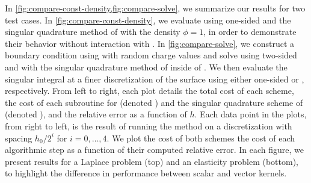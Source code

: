 In \cref{fig:compare-const-density,fig:compare-solve}, we summarize our results for two test cases. 
In \cref{fig:compare-const-density}, we evaluate \cite[Equation 8]{morse2020robust} using one-sided \qbkix and the singular quadrature method of \cite{YBZ} with the density $\phi=1$, in order to demonstrate their behavior without interaction with \gmres.
In \cref{fig:compare-solve}, we construct a boundary condition using \cite[Equation 25]{morse2020robust} with random charge values and solve \cite[Equation 5]{morse2020robust} using two-sided \qbkix and with the singular quadrature method of \cite{YBZ} inside of \gmres.
We then evaluate the singular integral at a finer discretization of the surface using either one-sided \qbkix or \cite{YBZ}, respectively.
From left to right, each plot details the total cost of each scheme, the cost of each subroutine for \qbkix (denoted ) and the singular quadrature scheme of \cite{YBZ} (denoted ), and the relative error as a function of $h$.
Each data point in the plots, from right to left, is the result of running the method on a discretization with spacing $h_0/2^i$ for $i=0,\hdots,4$.
We plot the cost of both schemes the cost of each algorithmic step as a function of their computed relative error. %
In each figure, we present results for a Laplace problem (top) and an elasticity problem (bottom), to highlight the difference in performance between scalar and vector kernels.

